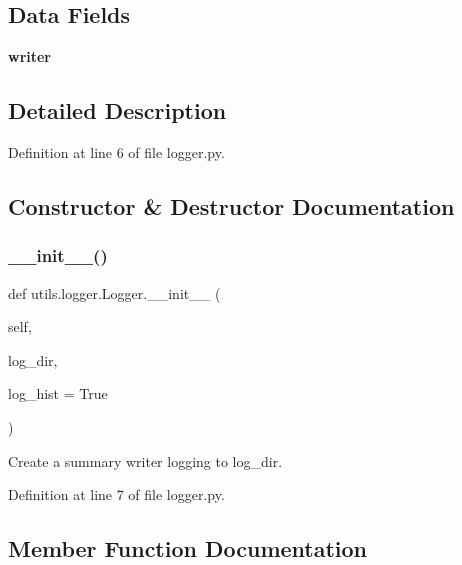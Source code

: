\subsection*{Data Fields}
\begin{DoxyCompactItemize}
\item 
\mbox{\label{classutils_1_1logger_1_1Logger_a54f4b44045fa1ecb8ba837478142faea}} 
{\bfseries writer}
\end{DoxyCompactItemize}


\subsection{Detailed Description}


Definition at line 6 of file logger.\+py.



\subsection{Constructor \& Destructor Documentation}
\mbox{\label{classutils_1_1logger_1_1Logger_aa25ef3824d13fe2b0fb812e40b61fe07}} 
\subsubsection{\texorpdfstring{\+\_\+\+\_\+init\+\_\+\+\_\+()}{\_\_init\_\_()}}
{\footnotesize\ttfamily def utils.\+logger.\+Logger.\+\_\+\+\_\+init\+\_\+\+\_\+ (\begin{DoxyParamCaption}\item[{}]{self,  }\item[{}]{log\+\_\+dir,  }\item[{}]{log\+\_\+hist = {\ttfamily True} }\end{DoxyParamCaption})}

\begin{DoxyVerb}Create a summary writer logging to log_dir.\end{DoxyVerb}
 

Definition at line 7 of file logger.\+py.



\subsection{Member Function Documentation}
\mbox{\label{classutils_1_1logger_1_1Logger_ab39b200c1f09fca5cbd65ae39752f7b2}} 
